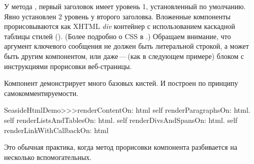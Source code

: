 \documentclass[a4paper,10pt,twoside]{book}
\begin{document}




У метода , первый заголовок имеет уровень 1,
установленный по умолчанию.
Явно установлен 2 уровень у второго заголовка.
Вложенные компоненты прорисовываются как XHTML \emph{div} контейнер
с использованием каскадной таблицы стилей ().
(Более подробно о CSS в .)
Обращаем внимание, что аргумент ключевого сообщения 
не должен быть литеральной строкой, а может быть другим компонентом,
или даже\,---\,(как в следующем примере) блоком с инструкциями
прорисовки веб-страницы.


Компонент  демонстрирует много базовых кистей.
И построен по принципу самокомментируемости.

\begin{code}{}
SeasideHtmlDemo>>>renderContentOn: html 
	self renderParagraphsOn: html.
	self renderListsAndTablesOn: html.
	self renderDivsAndSpansOn: html.
	self renderLinkWithCallbackOn: html
\end{code}


Это обычная практика,
когда метод прорисовки компонента разбивается на несколько вспомогательных.

\end{document}
